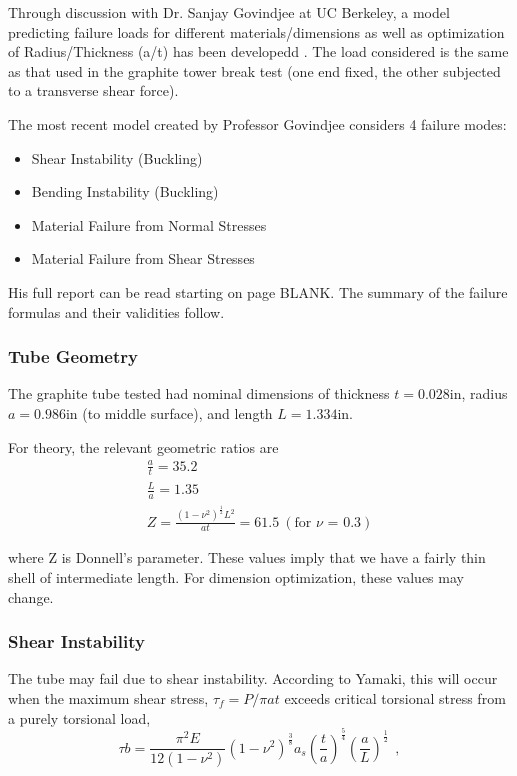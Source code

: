 \documentclass{report}
\begin{document}
Through discussion with Dr. Sanjay Govindjee at UC Berkeley, a model predicting failure loads for different materials/dimensions as well as optimization of Radius/Thickness (a/t) has been developedd . The load considered is the same as that used in the graphite tower break test (one end fixed, the other subjected to a transverse shear force).

The most recent model created by Professor Govindjee considers 4 failure modes:
\begin{itemize}
\item Shear Instability (Buckling)
\item Bending Instability (Buckling)
\item Material Failure from Normal Stresses
\item Material Failure from Shear Stresses
\end{itemize}

His full report can be read starting on page {\huge BLANK}. The summary of the failure formulas and their validities follow.

\subsubsection{Tube Geometry}
The graphite tube tested had nominal dimensions of thickness $t = 0.028$in, radius $a = 0.986$in (to middle surface), and length $L=1.334$in.

For theory, the relevant geometric ratios are
\begin{eqnarray}
\frac{a}{t} = 35.2 \\
\frac{L}{a} = 1.35 \\
Z = \frac{(1-\nu^2)^\frac{1}{2}L^2}{at} = 61.5 \ (\text{for $\nu$ = 0.3})
\end{eqnarray}

where Z is Donnell's parameter. These values imply that we have a fairly thin shell of intermediate length. For dimension optimization, these values may change.

\subsubsection{Shear Instability}

The tube may fail due to shear instability. According to Yamaki, this will occur when the maximum shear stress, $\tau_{f} = P/\pi at$ exceeds critical torsional stress from a purely torsional load,
$$
\tau{b} = \frac{\pi^2E}{12(1-\nu^2)}(1-\nu^2)^{\frac{3}{8}}a_s\left(\frac{t}{a}\right)^{\frac{5}{4}}\left(\frac{a}{L}\right)^{\frac{1}{2}}~~,
$$
\end{document}
